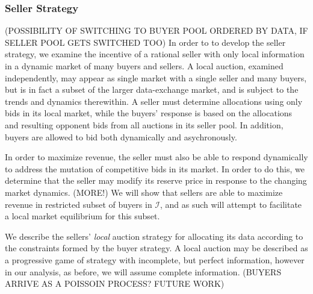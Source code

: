 \documentclass[12pt]{article}
\theoremstyle{definition}
\newcommand{\mcI}{\mathcal{I}}
\begin{document}
\begin{multicols}{2}
\subsubsection{Seller Strategy}
(POSSIBILITY OF SWITCHING TO BUYER POOL ORDERED BY DATA, IF SELLER POOL GETS
SWITCHED TOO)
In order to to develop the seller strategy, we examine the incentive of a
rational seller with only local information in a dynamic market of many
buyers and sellers. A local auction, examined independently, may appear as
single market with a single seller and many buyers, but is in fact a subset of the
larger data-exchange market, and is subject to the trends and dynamics
therewithin. A seller must determine allocations using only bids in its local market, while the buyers' response is based on the
allocations and resulting opponent bids from all auctions in its seller pool.
In addition, buyers are allowed to bid both dynamically and asychronously. 

In order to
maximize revenue, the seller must also be able to respond dynamically to
address the mutation of competitive bids in its market. In order to do this, we
determine that the seller may modify its reserve price in response to the
changing market dynamics. (MORE!)
We will show that sellers are able to maximize revenue in restricted subset of
buyers in $\mcI$, and as such will attempt to facilitate a local market
equilibrium for this subset.  

We describe the sellers' \emph{local} auction strategy for allocating its
data according to the constraints formed by the buyer strategy. A
local auction may be described as a progressive game of strategy with
incomplete, but perfect information, however in our analysis, as before, we will assume
complete information.
(BUYERS ARRIVE AS A POISSOIN PROCESS? FUTURE WORK)


\end{multicols}
\end{document}
